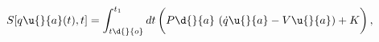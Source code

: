 \begin{equation} \label{eq:action}
 {S}[q\u{}{a}(t),t] =
\int_{t\d{}{o}}^{t_1} dt\,\bigg(P\d{}{a}\,\left( \dot{q}\u{}{a} - V\u{}{a}
\right)+ K\bigg)\,,
\end{equation}

